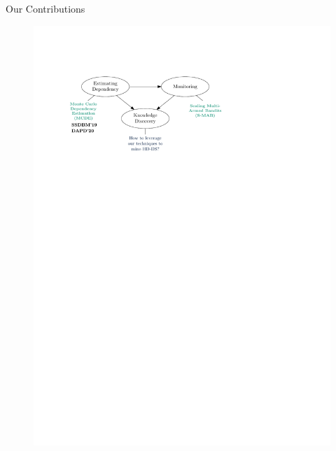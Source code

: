 \documentclass[16pt,usenames,dvipsnames, notheorems]{beamer}
\theoremstyle{definition}
\theoremstyle{example}
\theoremstyle{plain}
\begin{document}
\begin{frame}{Our Contributions}
\begin{figure}
\begin{overprint}
		 \includegraphics[width=1.0 \linewidth]{figures/outline_c_6-compressed.pdf}

\end{overprint}
\end{figure}
\end{frame}
\end{document}
